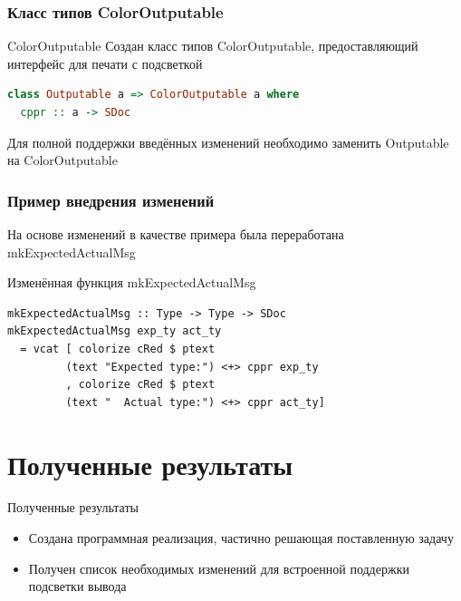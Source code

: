 \documentclass[utf8,russian]{beamer}
\begin{document}
\begin{frame}[fragile]
\frametitle{Класс типов ColorOutputable}

\begin{block}{ColorOutputable}
Создан класс типов ColorOutputable, предоставляющий интерфейс для печати с подсветкой
\begin{lstlisting}[language=Haskell]
class Outputable a => ColorOutputable a where
  cppr :: a -> SDoc
\end{lstlisting}
\end{block}

\begin{block}{}
Для полной поддержки введённых изменений необходимо заменить Outputable на ColorOutputable
\end{block}

\end{frame}

\begin{frame}[fragile]
\frametitle{Пример внедрения изменений}

\begin{block}{}
На основе изменений в качестве примера была переработана mkExpectedActualMsg
\end{block}

\begin{block}{Изменённая функция mkExpectedActualMsg}
\begin{lstlisting}
mkExpectedActualMsg :: Type -> Type -> SDoc
mkExpectedActualMsg exp_ty act_ty
  = vcat [ colorize cRed $ ptext 
         (text "Expected type:") <+> cppr exp_ty
         , colorize cRed $ ptext 
         (text "  Actual type:") <+> cppr act_ty]
\end{lstlisting}
\end{block}

\end{frame}

\section{Полученные результаты}
\begin{frame}{Полученные результаты}
\begin{itemize}
  \item Создана программная реализация, частично решающая поставленную задачу
  \item Получен список необходимых изменений для встроенной поддержки подсветки вывода
\end{itemize}
\end{frame}
\end{document}
